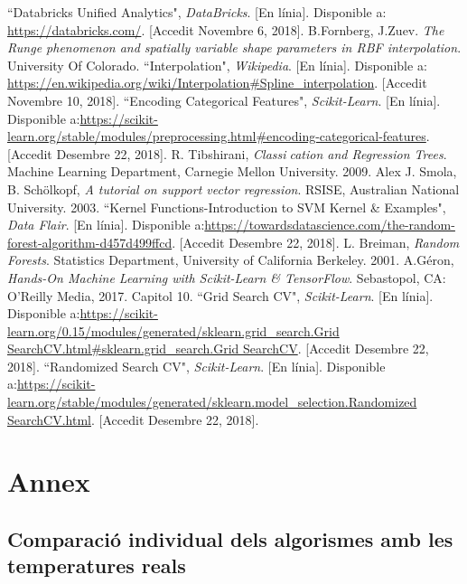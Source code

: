 \documentclass[10pt,a4paper,twocolumn,twoside]{article}
\begin{document}
\begin{thebibliography}{11}
``Databricks Unified Analytics", \textit{DataBricks}. [En línia]. Disponible a: \url{https://databricks.com/}. [Accedit Novembre 6, 2018].
B.Fornberg, J.Zuev. \textit{The Runge phenomenon and spatially variable shape parameters in RBF interpolation}. University Of Colorado.
 ``Interpolation", \textit{Wikipedia}. [En línia]. Disponible a: \url{https://en.wikipedia.org/wiki/Interpolation#Spline_interpolation}. [Accedit Novembre 10, 2018].
``Encoding Categorical Features", \textit{Scikit-Learn}. [En línia]. Disponible a:\url{https://scikit-learn.org/stable/modules/preprocessing.html#encoding-categorical-features}. [Accedit Desembre 22, 2018].
R. Tibshirani, \textit{Classication and Regression Trees}. Machine Learning Department, Carnegie Mellon University. 2009.
Alex J. Smola, B. Schölkopf, \textit{A tutorial on support vector regression}. RSISE, Australian National University. 2003.
``Kernel Functions-Introduction to SVM Kernel \& Examples", \textit{Data Flair}. [En línia]. Disponible a:\url{https://towardsdatascience.com/the-random-forest-algorithm-d457d499ffcd}. [Accedit Desembre 22, 2018].
L. Breiman, \textit{Random Forests}. Statistics Department, University of California Berkeley. 2001.
A.Géron, \textit{Hands-On Machine Learning with Scikit-Learn \& TensorFlow}. Sebastopol, CA: O’Reilly Media, 2017. Capitol 10.
``Grid Search CV", \textit{Scikit-Learn}. [En línia]. Disponible a:\url{https://scikit-learn.org/0.15/modules/generated/sklearn.grid_search.Grid SearchCV.html#sklearn.grid_search.Grid SearchCV}. [Accedit Desembre 22, 2018].
``Randomized Search CV", \textit{Scikit-Learn}. [En línia]. Disponible a:\url{https://scikit-learn.org/stable/modules/generated/sklearn.model_selection.Randomized SearchCV.html}. [Accedit Desembre 22, 2018].

\end{thebibliography}
\clearpage
\section{Annex}

\subsection{Comparació individual dels algorismes amb les temperatures reals}
\end{document}
